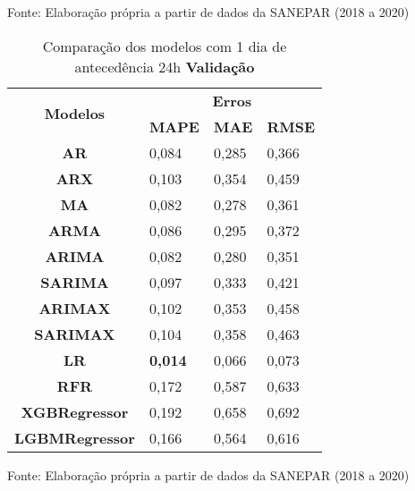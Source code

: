 \begin{table}[H]
Fonte: Elaboração própria a partir de dados da SANEPAR (2018 a 2020)
\end{table}

\begin{table}[H]
	\centering
	\caption{Comparação dos modelos com 1 dia de antecedência 24h \textbf{Validação} }\label{tb:1-24vld}
	\begin{tabular}{@{}clll@{}}
		\toprule
		\multirow{2}{*}{\textbf{Modelos}} & \multicolumn{3}{c}{\textbf{Erros}}                                                                       \\ \cmidrule(l){2-4} 
		& \multicolumn{1}{c}{\textbf{MAPE}} & \multicolumn{1}{c}{\textbf{MAE}} & \multicolumn{1}{c}{\textbf{RMSE}} \\ \hline
\textbf{AR}                       & 0,084                             & 0,285                            & 0,366                             \\
\textbf{ARX}                      & 0,103                             & 0,354                            & 0,459                             \\
\textbf{MA}                       & 0,082                             & 0,278                            & 0,361                             \\
\textbf{ARMA}                     & 0,086                             & 0,295                            & 0,372                             \\
\textbf{ARIMA}                    & 0,082                             & 0,280                            & 0,351                             \\
\textbf{SARIMA}                   & 0,097                             & 0,333                            & 0,421                             \\
\textbf{ARIMAX}                   & 0,102                             & 0,353                            & 0,458                             \\
\textbf{SARIMAX}                  & 0,104                             & 0,358                            & 0,463                             \\
\textbf{LR}                       & \textbf{0,014}                             & 0,066                            & 0,073                             \\
\textbf{RFR}                      & 0,172                             & 0,587                            & 0,633                             \\
\textbf{XGBRegressor}             & 0,192                             & 0,658                            & 0,692                             \\
\textbf{LGBMRegressor}            & 0,166                             & 0,564                            & 0,616                             \\ \bottomrule
	\end{tabular}

Fonte: Elaboração própria a partir de dados da SANEPAR (2018 a 2020)
\end{table}

